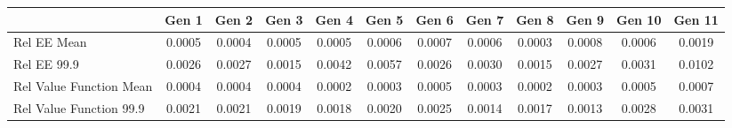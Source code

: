 
\begin{tabular}{@{}lccccccccccc@{}}
\hline
\hline
& Gen 1 & Gen 2 & Gen 3 & Gen 4 & Gen 5 & Gen 6 & Gen 7 & Gen 8 & Gen 9 & Gen 10 & Gen 11 \\
\hline
Rel EE Mean          & 0.0005 & 0.0004 & 0.0005 & 0.0005 & 0.0006 & 0.0007 & 0.0006 & 0.0003 & 0.0008 & 0.0006 & 0.0019 \\
Rel EE 99.9     & 0.0026 & 0.0027 & 0.0015 & 0.0042 & 0.0057 & 0.0026 & 0.0030 & 0.0015 & 0.0027 & 0.0031 & 0.0102 \\
Rel Value Function Mean       & 0.0004 & 0.0004 & 0.0004 & 0.0002 & 0.0003 & 0.0005 & 0.0003 & 0.0002 & 0.0003 & 0.0005 & 0.0007 \\
Rel Value Function 99.9  & 0.0021 & 0.0021 & 0.0019 & 0.0018 & 0.0020 & 0.0025 & 0.0014 & 0.0017 & 0.0013 & 0.0028 & 0.0031 \\
\bottomrule
\end{tabular}